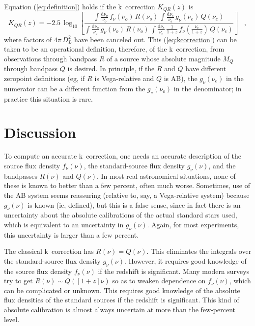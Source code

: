 \documentclass[preprint]{aastex}
\begin{document}
Equation (\ref{eq:definition}) holds if the k~correction $K_{QR}(z)$
is
\begin{equation}
\label{eq:kcorrection}
K_{QR}(z) = -2.5\,\log_{10}\left[
  \frac{\displaystyle
          \int\frac{\mathrm{d}\nu_o}{\nu_o}\,f_{\nu}(\nu_o)\,R(\nu_o)\,
          \int\frac{\mathrm{d}\nu_e}{\nu_e}\,
          g_{\nu}(\nu_e)\,                       Q(\nu_e)}
       {\displaystyle
          \int\frac{\mathrm{d}\nu_o}{\nu_o}\,g_{\nu}(\nu_o)\,R(\nu_o)\,
          \int\frac{\mathrm{d}\nu_e}{\nu_e}\,\frac{1}{1+z}\,
          f_{\nu}\left(\frac{\nu_e}{1+z}\right)\,Q(\nu_e)}
\right] \;\;\;,
\end{equation}
where factors of $4\pi\,D_L^2$ have been canceled out.  This
(\ref{eq:kcorrection}) can be taken to be an operational definition,
therefore, of the k~correction, from observations through bandpass $R$
of a source whose absolute magnitude $M_Q$ through bandpass $Q$ is
desired.  In principle, if the $R$ and $Q$ have different zeropoint
definitions (eg, if $R$ is Vega-relative and $Q$ is AB), the
$g_{\nu}(\nu_e)$ in the numerator can be a different function from the
$g_{\nu}(\nu_o)$ in the denominator; in practice this situation is rare.

\section{Discussion}

To compute an accurate k~correction, one needs an accurate description
of the source flux density $f_{\nu}(\nu)$, the standard-source flux
density $g_{\nu}(\nu)$, and the bandpasses $R(\nu)$ and $Q(\nu)$.  In
most real astronomical situations, none of these is known to better
than a few percent, often much worse.  Sometimes, use of the AB system
seems reassuring (relative to, say, a Vega-relative system) because
$g_{\nu}(\nu)$ is known (ie, defined), but this is a false sense,
since in fact there is an uncertainty about the absolute calibrations
of the actual standard stars used, which is equivalent to an
uncertainty in $g_{\nu}(\nu)$.  Again, for most experiments, this
uncertainty is larger than a few percent.

The classical k~correction has $R(\nu)=Q(\nu)$.  This eliminates the
integrals over the standard-source flux density $g_{\nu}(\nu)$.
However, it requires good knowledge of the source flux density
$f_{\nu}(\nu)$ if the redshift is significant.  Many modern surveys
try to get $R(\nu)\sim Q([1+z]\nu)$ so as to weaken dependence on
$f_{\nu}(\nu)$, which can be complicated or unknown.  This requires
good knowledge of the absolute flux densities of the standard sources
if the redshift is significant.  This kind of absolute calibration is
almost always uncertain at more than the few-percent level.



\end{document}
